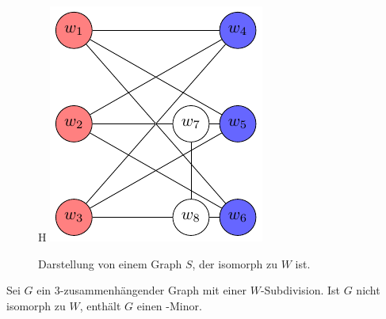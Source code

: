 \begin{figure}{H}
  \centering
  \includegraphics[keepaspectratio]{bilder/W2.pdf}
  \caption{Darstellung von einem Graph $S$, der isomorph zu $W$ ist.}
  \label{fig:W2}
\end{figure}
\begin{lemma}\label{eq:Lemma36}
  Sei $G$ ein $3$-zusammenhängender Graph mit einer $W$-Subdivision.
  Ist $G$ nicht isomorph zu $W$, enthält $G$ einen \kf-Minor.
  \cite{KeM92}
\end{lemma}
